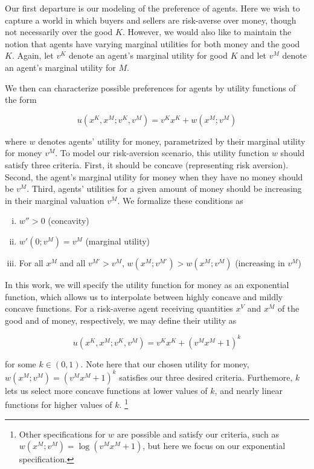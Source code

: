 \documentclass[AER]{AEA}
\begin{document}
Our first departure is our modeling of the preference of agents. Here we wish to capture a world in which buyers and sellers are risk-averse over money, though not necessarily over the good $K$. However, we would also like to maintain the notion that agents have varying marginal utilities for both money and the good $K$. Again, let $v^K$ denote an agent's marginal utility for good $K$ and let $v^M$ denote an agent's marginal utility for $M$. 

We then can characterize possible preferences for agents by utility functions of the form

$$
u(x^K, x^M; v^K, v^M) = v^K x^K + w(x^M; v^M)
$$

where $w$ denotes agents' utility for money, parametrized by their marginal utility for money $v^M$. To model our risk-aversion scenario, this utility function $w$ should satisfy three criteria. First, it should be concave (representing risk aversion). Second, the agent's marginal utility for money when they have no money should be $v^M$. Third, agents' utilities for a given amount of money should be increasing in their marginal valuation $v^M$. We formalize these conditions as

\begin{enumerate}[(i)]
    \item $w'' > 0$ (concavity)
    \item $w'(0; v^M) = v^M$ (marginal utility)
    \item For all $x^M$ and all $v^{M'} > v^M$, $w(x^M; v^{M'}) > w(x^M; v^M)$ (increasing in $v^M$)
\end{enumerate}

In this work, we will specify the utility function for money as an exponential function, which allows us to interpolate between highly concave and mildly concave functions. For a risk-averse agent receiving quantities $x^V$ and $x^M$ of the good and of money, respectively, we may define their utility as

$$
u(x^K, x^M; v^K, v^M) =  v^K x^K + (v^M x^M + 1)^k
$$

for some $k \in (0,1)$. Note here that our chosen utility for money, $w(x^M; v^M) = (v^M x^M+1)^k$ satisfies our three desired criteria. Furthemore, $k$ lets us select more concave functions at lower values of $k$, and nearly linear functions for higher values of $k$. \footnote{Other specifications for $w$ are possible and satisfy our criteria, such as $w(x^M; v^M) = \log(v^M x^M + 1)$, but here we focus on our exponential specification.}
\end{document}
